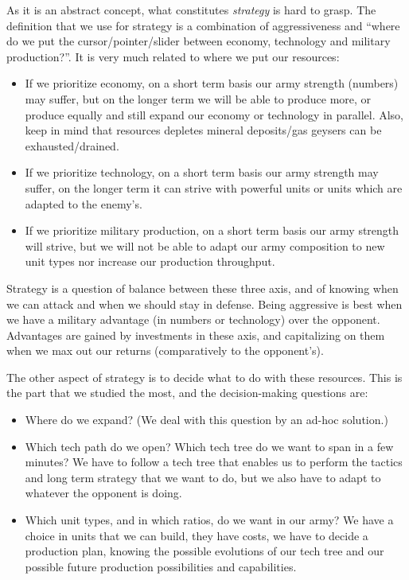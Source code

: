 As it is an abstract concept, what constitutes \textit{strategy} is hard to grasp. The definition that we use for strategy is a combination of aggressiveness and ``where do we put the cursor/pointer/slider between economy, technology and military production?''. It is very much related to where we put our resources:
\begin{itemize}
    \item If we prioritize economy, on a short term basis our army strength (numbers) may suffer, but on the longer term we will be able to produce more, or produce equally and still expand our economy or technology in parallel. Also, keep in mind that resources depletes mineral deposits/gas geysers can be exhausted/drained.
    \item If we prioritize technology, on a short term basis our army strength may suffer, on the longer term it can strive with powerful units or units which are adapted to the enemy's.
    \item If we prioritize military production, on a short term basis our army strength will strive, but we will not be able to adapt our army composition to new unit types nor increase our production throughput.
\end{itemize}
Strategy is a question of balance between these three axis, and of knowing when we can attack and when we should stay in defense. Being aggressive is best when we have a military advantage (in numbers or technology) over the opponent. Advantages are gained by investments in these axis, and capitalizing on them when we max out our returns (comparatively to the opponent's).

The other aspect of strategy is to decide what to do with these resources. This is the part that we studied the most, and the decision-making questions are:
\begin{itemize}
    \item Where do we expand? (We deal with this question by an ad-hoc solution.)
    \item Which tech path do we open? Which tech tree do we want to span in a few minutes? We have to follow a tech tree that enables us to perform the tactics and long term strategy that we want to do, but we also have to adapt to whatever the opponent is doing.
    \item Which unit types, and in which ratios, do we want in our army? We have a choice in units that we can build, they have costs, we have to decide a production plan, knowing the possible evolutions of our tech tree and our possible future production possibilities and capabilities.
\end{itemize}

